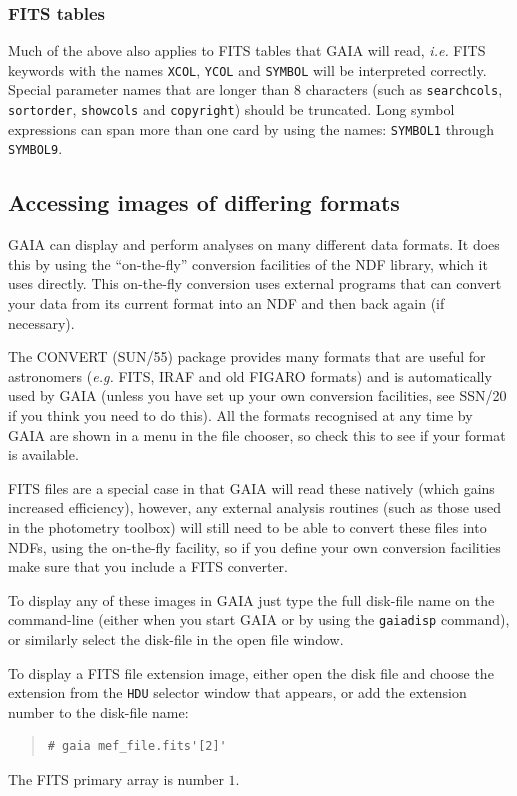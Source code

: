 \documentclass[twoside,11pt]{article}
\newcommand{\xref}[3]{#1}
\newcommand{\xlabel}[1]{}
\renewcommand{\_}{\texttt{\symbol{95}}}
\newcommand{\mytt}[1]{{\texttt{#1}}}
\begin{document}
\subsubsection{FITS tables} Much of the above also applies to FITS tables
that GAIA will read, \textit{i.e.} FITS keywords with the names
\mytt{X\_COL}, \mytt{Y\_COL} and \mytt{SYMBOL} will be interpreted
correctly. Special parameter names that are longer than 8 characters
(such as \mytt{search\_cols}, \mytt{sort\_order}, \mytt{show\_cols}
and \mytt{copyright}) should be truncated. Long symbol expressions can
span more than one card by using the names: \mytt{SYMBOL1} through
\mytt{SYMBOL9}.

\subsection{\xlabel{image_formats}Accessing images of differing formats}

GAIA can display and perform analyses on many different data
formats. It does this by using the ``on-the-fly'' conversion
facilities of the NDF library, which it uses directly. This on-the-fly
conversion uses external programs that can convert your data from its
current format into an NDF and then back again (if necessary).

The CONVERT \xref{(SUN/55)}{sun55}{} package provides many formats
that are useful for astronomers (\textit{e.g.} FITS, IRAF and old FIGARO
formats) and is automatically used by GAIA (unless you have set up
your own conversion facilities, see \xref{SSN/20}{ssn20}{} if you
think you need to do this). All the formats recognised at any time by
GAIA are shown in a menu in the file chooser, so check this to see
if your format is available.

FITS files are a special case in that GAIA will read these natively
(which gains increased efficiency), however, any external analysis
routines (such as those used in the photometry toolbox) will still
need to be able to convert these files into NDFs, using the on-the-fly
facility, so if you define your own conversion facilities make sure
that you include a FITS converter.

To display any of these images in GAIA just type the full disk-file
name on the command-line (either when you start GAIA or by using the
\mytt{gaiadisp} command), or similarly select the disk-file in the
open file window. 

To display a FITS file extension image, either open the disk file and
choose the extension from the \mytt{HDU} selector window that appears,
or add the extension number to the disk-file name:
\begin{quote}
\begin{verbatim}
# gaia mef_file.fits'[2]'
\end{verbatim}
\end{quote}
The FITS primary array is number $1$.
\end{document}

